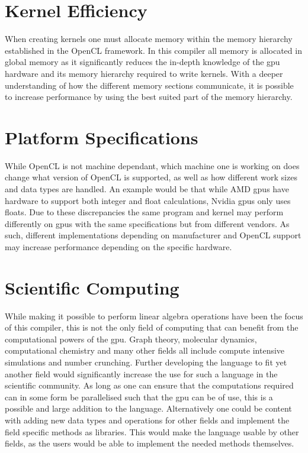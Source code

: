 \section{Kernel Efficiency}
When creating kernels one must allocate memory within the memory hierarchy established in the OpenCL framework.
In this compiler all memory is allocated in global memory as it significantly reduces the in-depth knowledge of the \acrshort{gpu} hardware and its memory hierarchy required to write kernels.
With a deeper understanding of how the different memory sections communicate, it is possible to increase performance by using the best suited part of the memory hierarchy.

\section{Platform Specifications}
While OpenCL is not machine dependant, which machine one is working on does change what version of OpenCL is supported, as well as how different work sizes and data types are handled.
An example would be that while AMD \acrshort{gpu}s have hardware to support both integer and float calculations, Nvidia \acrshort{gpu}s only uses floats.
Due to these discrepancies the same program and kernel may perform differently on \acrshort{gpu}s with the same specifications but from different vendors.
As such, different implementations depending on manufacturer and OpenCL support may increase performance depending on the specific hardware.

\section{Scientific Computing}
While making it possible to perform linear algebra operations have been the focus of this compiler, this is not the only field of computing that can benefit from the computational powers of the \acrshort{gpu}.
Graph theory, molecular dynamics, computational chemistry and many other fields all include compute intensive simulations and number crunching.
Further developing the language to fit yet another field would significantly increase the use for such a language in the scientific community.
As long as one can ensure that the computations required can in some form be parallelised such that the \acrshort{gpu} can be of use, this is a possible and large addition to the language.
Alternatively one could be content with adding new data types and operations for other fields and implement the field specific methods as libraries.
This would make the language usable by other fields, as the users would be able to implement the needed methods themselves.
